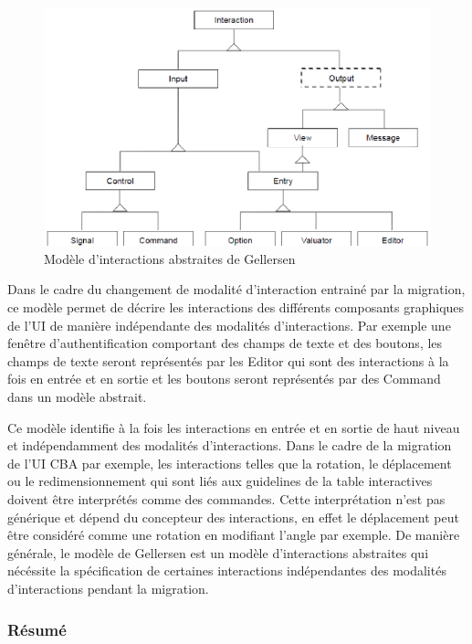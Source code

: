 \begin{figure}[h]
\begin{center}
\includegraphics[width=353pt]{chap2/img-5.eps}
\caption{Modèle d'interactions abstraites de Gellersen}\label{fig:chap2:15}
\end{center}
\end{figure}


Dans le cadre du changement de modalité d'interaction entrainé par la migration, ce modèle permet de décrire les interactions des différents composants 
graphiques de l'UI de manière indépendante des modalités d'interactions. Par exemple une fenêtre d'authentification comportant des champs de texte et des boutons, les champs de texte seront représentés par les Editor qui sont des interactions à la fois en entrée et en sortie et les boutons seront représentés par des Command dans un modèle abstrait. 

Ce modèle identifie à la fois les interactions en entrée et en sortie de haut niveau et indépendamment des modalités d'interactions. Dans le cadre de la migration de l'UI CBA par exemple, les interactions telles que la rotation, le déplacement ou le redimensionnement qui sont liés aux guidelines de la table interactives doivent être interprétés comme des commandes. Cette interprétation n'est pas générique et dépend du concepteur des interactions,  en effet le déplacement peut être considéré comme une rotation en modifiant l'angle par exemple. De manière générale, le modèle de Gellersen est un modèle d'interactions abstraites qui nécéssite la spécification de certaines interactions indépendantes des modalités d'interactions pendant la migration.


\subsubsection{Résumé}

